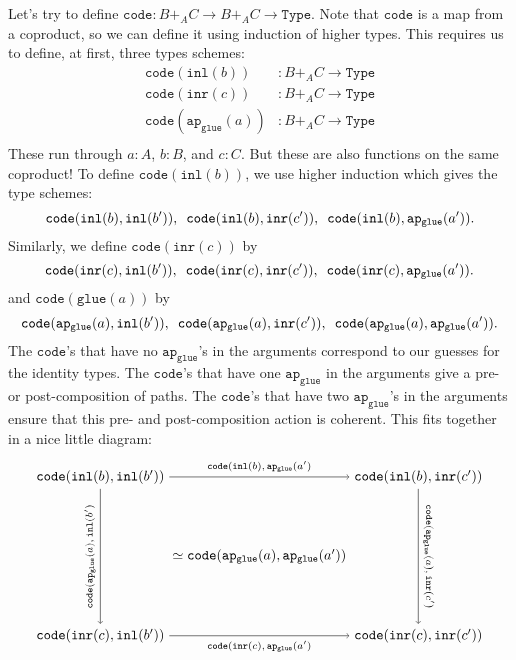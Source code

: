 \documentclass[11pt]{amsart}
\newcommand{\from}{\colon}
\newcommand{\tin}{\colon}
\newcommand{\type}[1]{\mathtt{#1}}
\begin{document}
Let's try to define 
$\type{code} \from B +_A C \to B +_A C \to \type{Type}$.  
Note that $\type{code}$ is a map from a coproduct, 
so we can define it using induction of higher types.
This requires us to define, at first, three types schemes:
\begin{align*}
	\type{code}(\type{inl}(b)) & \from B +_A C \to \type{Type} \\
	\type{code}(\type{inr}(c)) & \from B +_A C \to \type{Type} \\
	\type{code}(\type{ap_{glue}}(a)) & \from B +_A C \to \type{Type} \\
\end{align*}
These run through $a \tin A$, $b \tin B$, and $c \tin C$.  
But these are also functions on the same coproduct!
To define $\type{code}(\type{inl}(b))$, 
we use higher induction which gives the type schemes:
\[
	\type{code}(\type{inl}(b),\type{inl}(b')), \hspace{0.5em}
	\type{code}(\type{inl}(b),\type{inr}(c')), \hspace{0.5em}
	\type{code}(\type{inl}(b),\type{ap_{glue}}(a')).
\]
Similarly, we define $\type{code}(\type{inr}(c))$ by
\[
	\type{code}(\type{inr}(c),\type{inl}(b')), \hspace{0.5em}
	\type{code}(\type{inr}(c),\type{inr}(c')) , \hspace{0.5em}
	\type{code}(\type{inr}(c),\type{ap_{glue}}(a')).
\]
and $\type{code}(\type{glue}(a))$ by 
\[
	\type{code}(\type{ap_{glue}}(a),\type{inl}(b')), \hspace{0.5em}
	\type{code}(\type{ap_{glue}}(a),\type{inr}(c')) , \hspace{0.5em} 
	\type{code}(\type{ap_{glue}}(a),\type{ap_{glue}}(a')).
\]
The $\type{code}$'s that have 
no $\type{ap_{glue}}$'s in the arguments 
correspond to our guesses
for the identity types.
The $\type{code}$'s that have 
one $\type{ap_{glue}}$ in the arguments
give a pre- or post-composition
of paths.
The $\type{code}$'s that have 
two $\type{ap_{glue}}$'s in the arguments  
ensure that this pre- and post-composition
action is coherent.
This fits together in a nice little 
diagram:
\[
	\begin{tikzpicture}
		\node (AA) at (0,0) 
			{ $ \simeq \type{ code } ( \type{ ap_{glue} } ( a ) , \type{ ap_{glue} } ( a' )  )$ }; 
		\node (BB) at (-4,2) 
			{ $ \type{ code } ( \type{ inl } ( b ) , \type{ inl } ( b' )  )$ }; 
		\node (BC) at (4,2) 
			{ $ \type{ code } ( \type{ inl } ( b ) , \type{ inr } ( c' )  )$ }; 
		\node (CB) at (-4,-2) 
			{ $ \type{ code } ( \type{ inr } ( c ) , \type{ inl } ( b' )  )$ }; 
		\node (CC) at (4,-2) 
			{ $ \type{ code } ( \type{ inr } ( c ) , \type{ inr } ( c' )  )$ }; 
		\draw [->] (BB) to 
			node 
				[above] 
				{\scriptsize $ \type{ code } ( \type{ inl } ( b ) , \type{ ap_{glue} } ( a' ) $ } 
			(BC);
		\draw [->] (BB) to 	
			node 
				[rotate=90,above] 
				{ \scriptsize $ \type{ code } ( \type{ ap_{glue} } ( a ) , \type{ inl } ( b' ) $ } 
			(CB);
		\draw [->] (BC) to 
			node 
				[rotate=-90, above] 
				{\scriptsize $\type{ code } ( \type{ ap_{glue} } ( a ) , \type{ inr } ( c' ) $} 
			(CC);
		\draw [->] (CB) to 	
			node 
				[below] 
				{ \scriptsize $ \type{ code } ( \type{ inr } ( c ) , \type{ ap_{glue} } ( a' ) $ } 
			(CC);
	\end{tikzpicture}
\]
\end{document}
